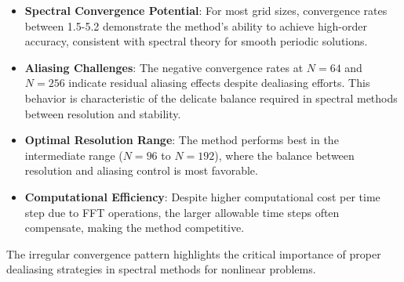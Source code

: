 \begin{itemize}
	\item \textbf{Spectral Convergence Potential}: For most grid sizes, convergence rates between 1.5-5.2 demonstrate the method's ability to achieve high-order accuracy, consistent with spectral theory for smooth periodic solutions.
	\item \textbf{Aliasing Challenges}: The negative convergence rates at $N=64$ and $N=256$ indicate residual aliasing effects despite dealiasing efforts. This behavior is characteristic of the delicate balance required in spectral methods between resolution and stability.
	\item \textbf{Optimal Resolution Range}: The method performs best in the intermediate range ($N=96$ to $N=192$), where the balance between resolution and aliasing control is most favorable.
	\item \textbf{Computational Efficiency}: Despite higher computational cost per time step due to FFT operations, the larger allowable time steps often compensate, making the method competitive.
\end{itemize}
%
The irregular convergence pattern highlights the critical importance of proper dealiasing strategies in spectral methods for nonlinear problems.

